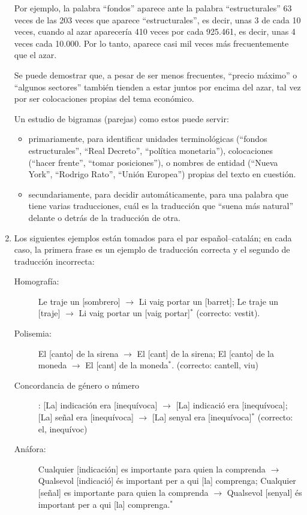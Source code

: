 \begin{enumerate}
Por ejemplo, la palabra ``fondos'' aparece ante la palabra ``estructurales'' 63 veces de las 203 veces que aparece ``estructurales'', es decir, unas 3 de cada 10 veces, cuando al azar aparecería 410 veces por cada 925.461, es decir, unas 4 veces cada 10.000. Por lo tanto, aparece casi mil veces más frecuentemente que el azar. 

Se puede demostrar que, a pesar de ser menos frecuentes, ``precio máximo'' o ``algunos sectores'' también tienden a estar juntos por encima del azar, tal vez por ser colocaciones propias del tema económico. 

Un estudio de bigramas (parejas) como estos puede servir: 

\begin{itemize} \item primariamente, para identificar unidades terminológicas (``fondos estructurales'', ``Real Decreto'', ``política monetaria''), colocaciones (``hacer frente'', ``tomar posiciones''), o nombres de entidad (``Nueva York'', ``Rodrigo Rato'', ``Unión Europea'') propias del texto en cuestión. 

\item secundariamente, para decidir automáticamente, para una palabra que tiene varias traducciones, cuál es la traducción que ``suena más natural'' delante o detrás de la traducción de otra. \end{itemize} 

\item Los siguientes ejemplos están tomados para el par español--catalán; en cada caso, la primera frase es un ejemplo de traducción correcta y el segundo de traducción incorrecta: \begin{description} \item[Homografía:] Le traje un [sombrero] $\rightarrow$ Li vaig portar un [barret]; Le traje un [traje] $\rightarrow$ Li vaig portar un [vaig portar]$^*$ (correcto: vestit). \item[Polisemia:] El [canto] de la sirena $\rightarrow$ El [cant] de la sirena; El [canto] de la moneda $\rightarrow$ El [cant] de la moneda$^*$. (correcto: cantell, viu) \item[Concordancia de género o número]: [La] indicación era [inequívoca] $\rightarrow$ [La] indicació era [inequívoca]; [La] señal era [inequívoca] $\rightarrow$ [La] senyal era [inequívoca]$^*$ (correcto: el, inequívoc) \item[Anáfora:] Cualquier [indicación] es importante para quien la comprenda $\rightarrow$ Qualsevol [indicació] és important per a qui [la] comprenga; Cualquier [señal] es importante para quien la comprenda $\rightarrow$ Qualsevol [senyal] és important per a qui [la] comprenga.$^*$ \end{description} 


\end{enumerate}
